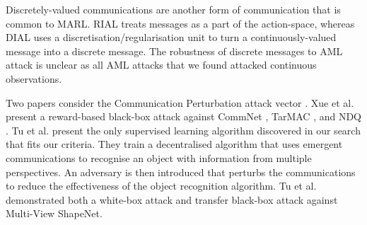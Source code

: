 \documentclass[conference,compsoc]{IEEEtran}
\begin{document}
Discretely-valued communications are another form of communication that is common to MARL. RIAL \cite{foerster_learning_2016-1} treats messages as a part of the action-space, whereas DIAL \cite{foerster_learning_2016-1} uses a discretisation/regularisation unit to turn a continuously-valued message into a discrete message. The robustness of discrete messages to AML attack is unclear as all AML attacks that we found attacked continuous observations. 

Two papers consider the Communication Perturbation attack vector \cite{xue_mis-spoke_2022,tu_adversarial_2021}. Xue et al. \cite{xue_mis-spoke_2022} present a reward-based black-box attack against CommNet \cite{sukhbaatar_learning_2016}, TarMAC \cite{das_tarmac_2019}, and NDQ \cite{wang_learning_2020-2}. Tu et al. \cite{tu_adversarial_2021} present the only supervised learning algorithm discovered in our search that fits our criteria. They train a decentralised algorithm that uses emergent communications to recognise an object with information from multiple perspectives. An adversary is then introduced that perturbs the communications to reduce the effectiveness of the object recognition algorithm. Tu et al. \cite{tu_adversarial_2021} demonstrated both a white-box attack and transfer black-box attack against Multi-View ShapeNet.
\end{document}
